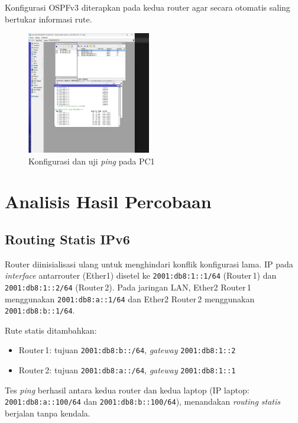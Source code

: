 Konfigurasi OSPFv3 diterapkan pada kedua router agar secara otomatis saling bertukar informasi rute.

\begin{figure}[H]
    \centering
    \includegraphics[width=0.48\textwidth]{img/A3.jpeg}
    \caption{Konfigurasi dan uji \textit{ping} pada PC1}
    \label{fig:a3}
\end{figure}

\newpage
\section{Analisis Hasil Percobaan}

\subsection{Routing Statis IPv6}

Router diinisialisasi ulang untuk menghindari konflik konfigurasi lama. IP pada \textit{interface} antarr­outer (Ether1) disetel ke
\texttt{2001:db8:1::1/64} (Router\,1) dan \texttt{2001:db8:1::2/64} (Router\,2). Pada jaringan LAN,
Ether2 Router\,1 menggunakan \texttt{2001:db8:a::1/64} dan Ether2 Router\,2 menggunakan \texttt{2001:db8:b::1/64}.

Rute statis ditambahkan:
\begin{itemize}
    \item Router\,1: tujuan \texttt{2001:db8:b::/64}, \textit{gateway} \texttt{2001:db8:1::2}
    \item Router\,2: tujuan \texttt{2001:db8:a::/64}, \textit{gateway} \texttt{2001:db8:1::1}
\end{itemize}

Tes \textit{ping} berhasil antara kedua router dan kedua laptop (IP laptop: \texttt{2001:db8:a::100/64} dan \texttt{2001:db8:b::100/64}), menandakan \textit{routing statis} berjalan tanpa kendala.

